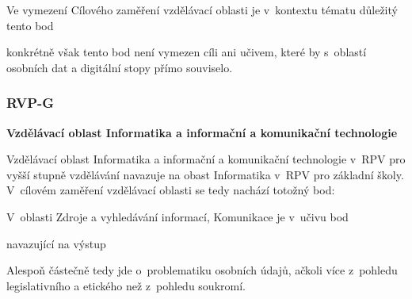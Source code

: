 Ve vymezení Cílového zaměření vzdělávací oblasti je v~kontextu tématu důležitý tento bod

\begin{displayquote}
	\citep{rvp-zs}
\end{displayquote}

konkrétně však tento bod není vymezen cíli ani učivem, které by s~oblastí osobních dat a digitální stopy přímo souviselo.

\subsubsection*{RVP-G}

\textbf{Vzdělávací oblast Informatika a informační a komunikační technologie}

Vzdělávací oblast Informatika a informační a komunikační technologie v~RPV pro vyšší stupně vzdělávání navazuje na obast Informatika v~RPV pro základní školy. V~cílovém zaměření vzdělávací oblasti se tedy nachází totožný bod:

\begin{displayquote}
	\citep{rvp-g}
\end{displayquote}

V~oblasti Zdroje a vyhledávání informací, Komunikace je v~učivu bod

\begin{displayquote}
	\citep{rvp-g}
\end{displayquote}

navazující na výstup

\begin{displayquote}
	\citep{rvp-g}
\end{displayquote}

Alespoň částečně tedy jde o~problematiku osobních údajů, ačkoli více z~pohledu legislativního a etického než z~pohledu soukromí.

